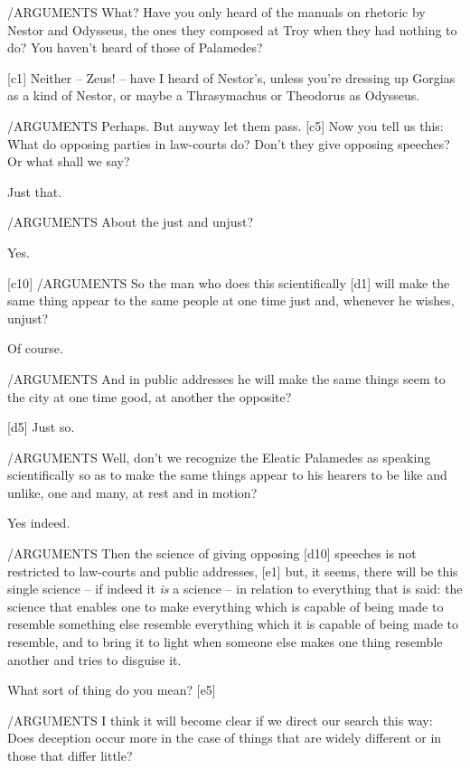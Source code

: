 /ARGUMENTS What? Have you only heard of the manuals on rhetoric
by Nestor and Odysseus, the ones they composed at Troy when they had
nothing to do? You haven't heard of those of
Palamedes?

{[}c1{]}  Neither -- Zeus! -- have I heard of Nestor's, unless
you're dressing up Gorgias as a kind of Nestor, or maybe a Thrasymachus
or Theodorus as
Odysseus.

/ARGUMENTS Perhaps. But anyway let them pass. {[}c5{]} Now you
tell us this: What do opposing parties in law-courts do? Don't they give
opposing speeches? Or what shall we say?

 Just that.

/ARGUMENTS About the just and unjust?

 Yes.

{[}c10{]} /ARGUMENTS So the man who does this scientifically
{[}d1{]} will make the same thing appear to the same people at one time
just and, whenever he wishes, unjust?

 Of course.

/ARGUMENTS And in public addresses he will make the same things
seem to the city at one time good, at another the
opposite?

{[}d5{]}  Just so.

/ARGUMENTS Well, don't we recognize the Eleatic Palamedes as
speaking scientifically so as to make the same things appear to his
hearers to be like and unlike, one and many, at rest and in
motion?

 Yes indeed.

/ARGUMENTS Then the science of giving opposing {[}d10{]}
speeches is not restricted to law-courts and public addresses, {[}e1{]}
but, it seems, there will be this single science -- if indeed it
{\em is} a science -- in relation to everything that is said: the
science that enables one to make everything which is capable of being
made to resemble something else resemble everything which it is capable
of being made to resemble, and to bring it to light when someone else
makes one thing resemble another and tries to disguise it.

 What sort of thing do you mean? {[}e5{]}

/ARGUMENTS I think it will become clear if we direct our search
this way: Does deception occur more in the case of things that are
widely different or in those that differ little?

